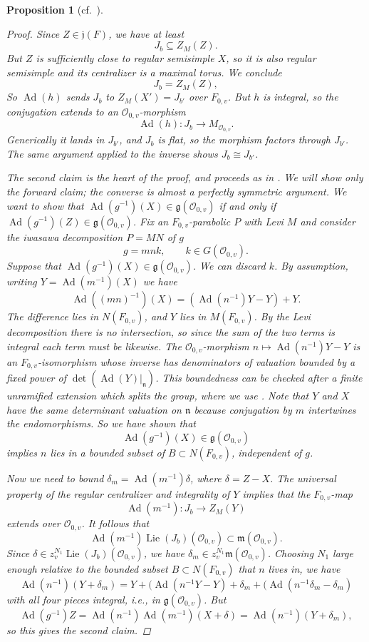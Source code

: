 \documentclass[openany]{amsbook}
\newtheorem{proposition}[theorem]{Proposition}
\theoremstyle{definition}
\theoremstyle{remark}
\numberwithin{equation}{section}
\renewcommand{\O}{\mathcal{O}}
\renewcommand{\-}{\operatorname{-}}
\newcommand{\on}[1]{\operatorname{#1}}
\newcommand{\fm}{\mathfrak{m}}
\newcommand{\fn}{\mathfrak{n}}
\renewcommand{\fm}{\mathfrak{m}}
\renewcommand{\fg}{\mathfrak{g}}
\newcommand{\fj}{\mathfrak{j}}
\newcommand{\Lie}{\on{Lie}}
\newcommand{\Ad}{\on{Ad}}
\begin{document}
\begin{proposition}[{cf.\ \cite[\S 18.7]{CLII}}]
\begin{proof}
        Since $Z \in \fj(F)$, we have at least 
        $$
            J_b \subseteq Z_M(Z).
        $$
        But $Z$ is sufficiently close to regular semisimple $X$, so it is also regular semisimple and its centralizer is a maximal torus. We conclude 
        $$
            J_b = Z_M(Z),
        $$
        So $\Ad(h)$ sends $J_b$ to $Z_M(X') = J_{b'}$ over $F_{0,v}$. But $h$ is integral, so the conjugation extends to an $\O_{0,v}$-morphism
        $$
            \Ad(h) : J_b \to M_{\O_{0,v}}.
        $$
        Generically it lands in $J_{b'}$, and $J_b$ is flat, so the morphism factors through $J_{b'}$. The same argument applied to the inverse shows $J_{b} \cong J_{b'}$.

        The second claim is the heart of the proof, and proceeds as in \cite[Proposition 18.7.1]{CLII}. We will show only the forward claim; the converse is almost a perfectly symmetric argument. We want to show that $\Ad(g^{-1})(X) \in \fg(\O_{0,v})$ if and only if $\Ad(g^{-1})(Z) \in \fg(\O_{0,v})$. Fix an $F_{0,v}$-parabolic $P$ with Levi $M$ and consider the iwasawa decomposition $P = MN$ of $g$
        $$
            g = mnk, \qquad k \in G(\O_{0,v}).
        $$
        Suppose that $\Ad(g^{-1})(X) \in \fg(\O_{0,v})$. We can discard $k$. By assumption, writing $Y = \Ad(m^{-1})(X)$ we have
        $$
            \Ad((mn)^{-1})(X) = (\Ad(n^{-1})Y - Y) + Y.
        $$
        The difference lies in $N(F_{0,v})$, and $Y$ lies in $M(F_{0,v})$. By the Levi decomposition there is no intersection, so since the sum of the two terms is integral each term must be likewise. The $\O_{0,v}$-morphism $n \mapsto \Ad(n^{-1}) Y - Y$ is an $F_{0,v}$-isomorphism whose inverse has denominators of valuation bounded by a fixed power of $\det(\Ad(Y)|_{\fn})$. This boundedness can be checked after a finite unramified extension which splits the group, where we use \cite[Lemme 18.7.2]{CLII}. Note that $Y$ and $X$ have the same determinant valuation on $\fn$ because conjugation by $m$ intertwines the endomorphisms. So we have shown that
        $$
            \Ad(g^{-1})(X) \in \fg(\O_{0,v})
        $$
        implies $n$ lies in a bounded subset of $B \subset N(F_{0,v})$, independent of $g$. 

        Now we need to bound $\delta_m =\Ad(m^{-1})\delta$, where $\delta = Z - X$. The universal property of the regular centralizer and integrality of $Y$ implies that the $F_{0,v}$-map
        $$
            \Ad(m^{-1}) : J_{b} \to Z_M(Y)
        $$
        extends over $\O_{0,v}$. It follows that 
        $$
            \Ad(m^{-1})\Lie(J_b)(\O_{0,v}) \subset \fm(\O_{0,v}).
        $$
        Since $\delta \in z_v^{N_1} \Lie(J_b)(\O_{0,v})$, we have $\delta_m \in z_v^{N_1} \fm(\O_{0,v})$. Choosing $N_1$ large enough relative to the bounded subset $B \subset N(F_{0,v})$ that $n$ lives in, we have
        $$
            \Ad(n^{-1})(Y + \delta_m) = Y + (\Ad(n^{-1} Y - Y) + \delta_m + (\Ad(n^{-1} \delta_m - \delta_m)
        $$
        with all four pieces integral, i.e., in $\fg(\O_{0,v})$. But 
        $$
            \Ad(g^{-1})Z = \Ad(n^{-1}) \Ad(m^{-1})(X + \delta) = \Ad(n^{-1}) (Y + \delta_m),
        $$
        so this gives the second claim. 


\end{proof}
\end{proposition}
\end{document}
